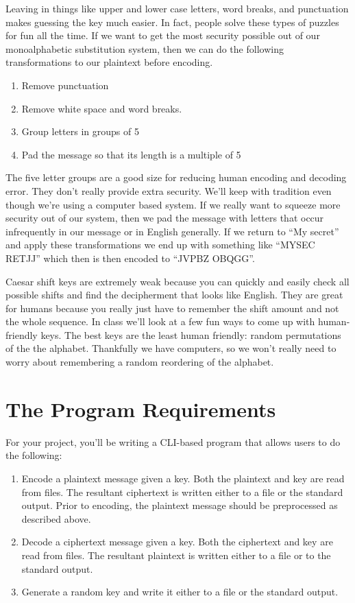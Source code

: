 \documentclass[]{tufte-handout}
\begin{document}
Leaving in things like upper and lower case letters, word breaks, and punctuation makes guessing the key much easier. In fact, people solve these types of puzzles for fun all the time. If we want to get the most security possible out of our monoalphabetic substitution system, then we can do the following transformations to our plaintext before encoding.
\begin{enumerate}
\item Remove punctuation
\item Remove white space and word breaks.
\item Group letters in groups of 5
\item Pad the message so that its length is a multiple of 5
\end{enumerate}
The five letter groups are a good size for reducing human encoding and decoding error.  They don't really provide extra security. We'll keep with tradition even though we're using a computer based system. If we really want to squeeze more security out of our system, then we pad the message with letters that occur infrequently in our message or in English generally. If we return to ``My secret'' and apply these transformations we end up with something like ``MYSEC RETJJ'' which then is then encoded to ``JVPBZ OBQGG''.    

Caesar shift keys are extremely weak because you can quickly and easily check all possible shifts and find the decipherment that looks like English. They are great for humans because you really just have to remember the shift amount and not the whole sequence. In class we'll look at a few fun ways to come up with human-friendly keys.  The best keys are the least human friendly: random permutations of the the alphabet. Thankfully we have computers, so we won't really need to worry about remembering a random reordering of the alphabet.

\section{The Program Requirements}

For your project, you'll be writing a CLI-based program that allows users to do the following:
\begin{enumerate}
\item Encode a plaintext message given a key. Both the plaintext and key are read from files. The resultant ciphertext is written either to a file or the standard output. Prior to encoding, the plaintext message should be preprocessed as described above.
\item Decode a ciphertext message given a key. Both the ciphertext and key are read from files. The resultant plaintext is written either to a file or to the standard output.
\item Generate a random key and write it either to a file or the standard output.  
\end{enumerate}
\end{document}
